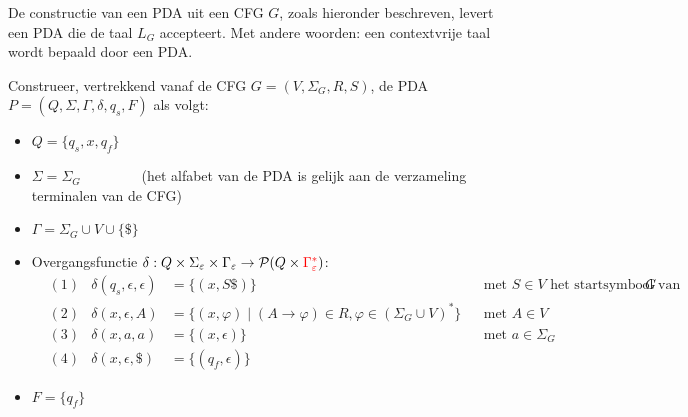\documentclass[../aanvullingen_cursus.tex]{subfiles}
\begin{document}
\begin{stelling}
	De constructie van een PDA uit een CFG \(G\), zoals hieronder beschreven, levert een PDA die de taal \(L_G\) accepteert. Met andere woorden: een contextvrije taal wordt bepaald door een PDA.

	\hfill

	Construeer, vertrekkend vanaf de CFG \(G=(V,\Sigma_G,R,S)\), de PDA \(P=(Q,\Sigma,\Gamma,\delta,q_s,F)\) als volgt:
	\begin{itemize}
		\item \(Q=\{q_s,x,q_f\}\)
		\item \(\Sigma = \Sigma_G \qquad \qquad\) \scriptsize(het alfabet van de PDA is gelijk aan de verzameling terminalen van de CFG) \normalsize
		\item \(\Gamma = \Sigma_G \cup V \cup \{\$\}\)
		\item Overgangsfunctie \(\delta:Q\times \Sigma_\epsilon \times \Gamma_\epsilon \to \powerset[Q\times\color{red}\Gamma_\epsilon^*\color{black}]\):
		\begin{align*}
			&(1) & \delta(q_s,\epsilon,\epsilon) &=\{(x,S\$)\} && \text{met \(S\in V\) het startsymbool van }G \\
			&(2) & \delta(x,\epsilon, A) &= \{(x,\varphi) \mid (A\rightarrow\varphi) \in R, \varphi \in (\Sigma_G \cup V)^*\} && \text{met } A \in V \\
			&(3) & \delta(x,a,a) &= \{(x,\epsilon)\} && \text{met } a \in \Sigma_G \\
			&(4) & \delta(x,\epsilon,\$) &= \{(q_f,\epsilon)\}
		\end{align*}
		\item \(F=\{q_f\}\)
	\end{itemize}
\end{stelling}

\newpage
\end{document}
